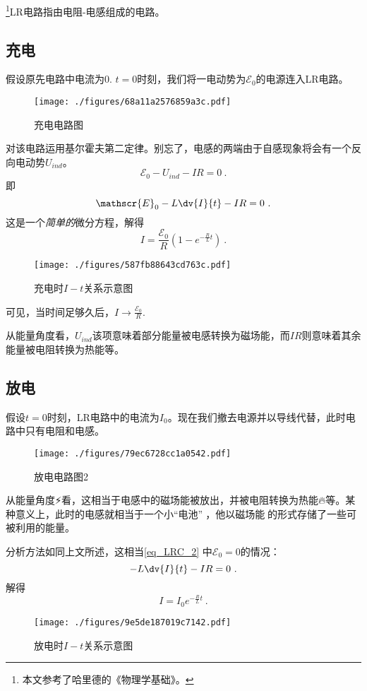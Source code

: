 

\footnote{本文参考了哈里德的《物理学基础》。}LR电路指由电阻-电感组成的电路。

\subsection{充电}
假设原先电路中电流为$0$. $t=0$时刻，我们将一电动势为$\mathscr{E}_0$的电源连入LR电路。
\begin{figure}[ht]
\centering
\texttt{[image: ./figures/68a11a2576859a3c.pdf]}
\caption{充电电路图} \label{fig_LRC_1}
\end{figure}

对该电路运用基尔霍夫第二定律。别忘了，电感的两端由于自感现象将会有一个反向电动势$U_{ind}$。
$$
\mathscr{E}_0 - U_{ind} - IR = 0~.
$$
即
\begin{equation}\label{eq_LRC_2}
\mathscr{E}_0 - L\dv{I}{t} - IR = 0~.
\end{equation}
这是一个\textsl{简单的}微分方程，解得
\begin{equation}\label{eq_LRC_1}
I = \frac{\mathscr{E}_0}{R} (1-e^{-\frac{R}{L}t})~.
\end{equation}

\begin{figure}[ht]
\centering
\texttt{[image: ./figures/587fb88643cd763c.pdf]}
\caption{充电时$I-t$关系示意图} \label{fig_LRC_3}
\end{figure}
可见，当时间足够久后，$I\to\frac{\mathscr{E_0}}{R}$.

从能量角度看，$U_{ind}$该项意味着部分能量被电感转换为磁场能，而$IR$则意味着其余能量被电阻转换为热能等。

\subsection{放电}
假设$t=0$时刻，LR电路中的电流为$I_0$。现在我们撤去电源并以导线代替，此时电路中只有电阻和电感。
\begin{figure}[ht]
\centering
\texttt{[image: ./figures/79ec6728cc1a0542.pdf]}
\caption{放电电路图2} \label{fig_LRC_2}
\end{figure}
从能量角度⚡️看，这相当于电感中的磁场能被放出，并被电阻转换为热能🔥等。某种意义上，此时的电感就相当于一个小“电池”🔋，他以磁场能🧲的形式存储了一些可被利用的能量。

分析方法如同上文所述，这相当\autoref{eq_LRC_2}  中$\mathscr{E}_0=0$的情况：
\begin{equation}
- L\dv{I}{t} - IR = 0~.
\end{equation}
解得
\begin{equation}
I = I_0 e^{-\frac{R}{L}t}~.
\end{equation}
\begin{figure}[ht]
\centering
\texttt{[image: ./figures/9e5de187019c7142.pdf]}
\caption{放电时$I-t$关系示意图} \label{fig_LRC_4}
\end{figure}
